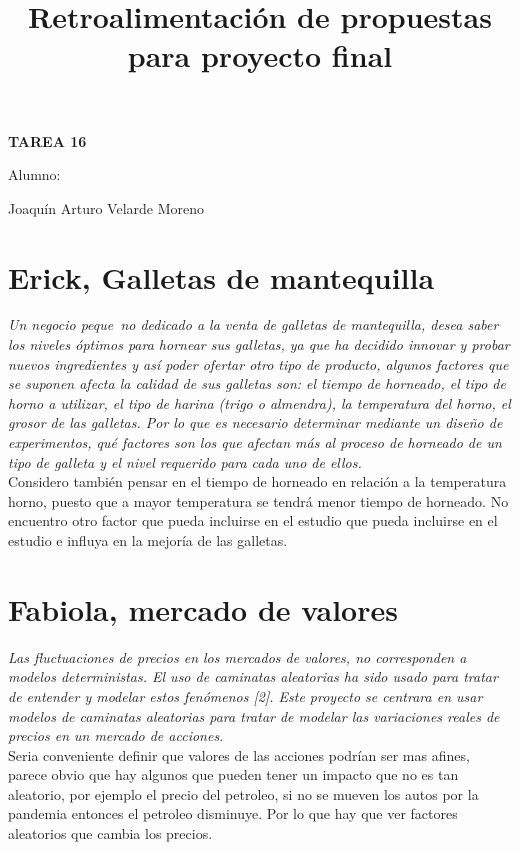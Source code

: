 \documentclass[]{article}
\title{Retroalimentación de propuestas para proyecto final}
\date{}
\begin{document}
	\maketitle
	\begin{center}


\centerline{\textbf{TAREA 16} } 
\textbf{ }

\centerline{Alumno: } 
\centerline{Joaquín Arturo Velarde Moreno}


	\end{center}
	

\section{Erick, Galletas de mantequilla}
\emph{Un negocio peque~no dedicado a la venta de galletas de mantequilla, desea saber los niveles
óptimos para hornear sus galletas, ya que ha decidido innovar y probar nuevos ingredientes
y así poder ofertar otro tipo de producto, algunos factores que se suponen afecta la calidad
de sus galletas son: el tiempo de horneado, el tipo de horno a utilizar, el tipo de harina (trigo
o almendra), la temperatura del horno, el grosor de las galletas. Por lo que es necesario
determinar mediante un diseño de experimentos, qué factores son los que afectan más al
proceso de horneado de un tipo de galleta y el nivel requerido para cada uno de ellos.}\\


Considero también pensar en el tiempo de horneado en relación a la temperatura horno, puesto que a mayor temperatura se tendrá menor tiempo de horneado. No encuentro otro factor que pueda incluirse en el estudio que pueda incluirse en el estudio e influya en la mejoría de las galletas.

\section{Fabiola, mercado de valores}
\emph{Las fluctuaciones de precios en los mercados de valores, no corresponden a modelos deterministas. El uso de caminatas aleatorias ha sido usado para tratar de entender y modelar estos fenómenos [2]. Este proyecto se centrara en usar modelos de caminatas aleatorias para tratar de modelar las variaciones reales de precios en un mercado de acciones.}
\\

Seria conveniente definir que valores  de las acciones podrían ser mas afines, parece obvio que hay algunos que pueden tener un impacto que no es tan aleatorio, por ejemplo el precio del petroleo, si no se mueven los autos por la pandemia entonces el petroleo disminuye. Por lo que hay que ver factores aleatorios que cambia los precios.
\end{document}
